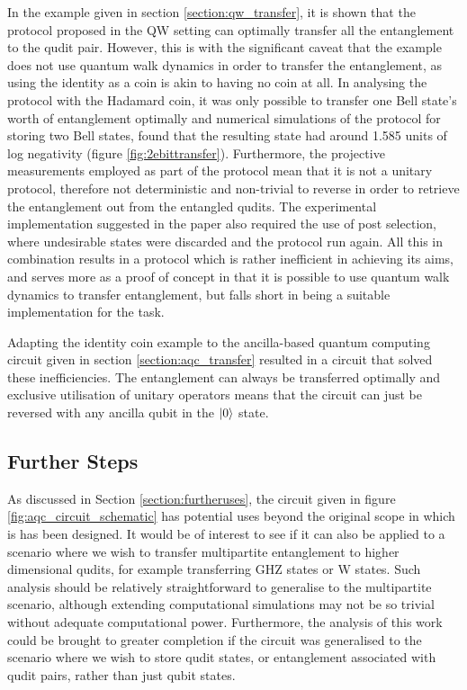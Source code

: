 In the example given in section \ref{section:qw_transfer}, it is shown that the protocol proposed in the QW setting can optimally transfer all the entanglement to the qudit pair.
However, this is with the significant caveat that the example does not use quantum walk dynamics in order to transfer the entanglement, as using the identity as a coin is akin to having no coin at all.
In analysing the protocol with the Hadamard coin, it was only possible to transfer one Bell state's worth of entanglement optimally and
numerical simulations of the protocol for storing two Bell states, found that the resulting state had around 1.585 units of log negativity (figure \ref{fig:2ebittransfer}).
Furthermore, the projective measurements employed as part of the protocol mean that it is not a unitary protocol, therefore not deterministic and non-trivial to reverse in order to retrieve the entanglement out from the entangled qudits.
The experimental implementation suggested in the paper also required the use of post selection, where undesirable states were discarded and the protocol run again.
All this in combination results in a protocol which is rather inefficient in achieving its aims, and serves more as a proof of concept in that it is possible to use quantum walk dynamics to transfer entanglement, but falls short in being a suitable implementation for the task.

Adapting the identity coin example to the ancilla-based quantum computing circuit given in section \ref{section:aqc_transfer} resulted in a circuit that solved these inefficiencies.
The entanglement can always be transferred optimally and exclusive utilisation of unitary operators means that the circuit can just be reversed with any ancilla qubit in the $\ket{0}$ state.

\subsection{Further Steps}
\label{subsection:furthersteps}
As discussed in Section \ref{section:furtheruses}, the circuit given in figure \ref{fig:aqc_circuit_schematic} has potential uses beyond the original scope in which is has been designed.
It would be of interest to see if it can also be applied to a scenario where we wish to transfer multipartite entanglement to higher dimensional qudits, for example transferring GHZ states or W states.
Such analysis should be relatively straightforward to generalise to the multipartite scenario, although extending computational simulations may not be so trivial without adequate computational power.
Furthermore, the analysis of this work could be brought to greater completion if the circuit was generalised to the scenario where we wish to store qudit states, or entanglement associated with qudit pairs, rather than just qubit states.